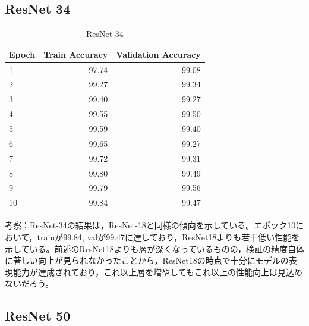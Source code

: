 \documentclass[a4paper,11pt,titlepage]{jsarticle}
\begin{document}
\subsection{ResNet 34}
\begin{table}[h]
\centering
\caption{ResNet-34}
\label{tab:ResNet34}
\begin{tabular}{lrr}
\hline
 Epoch &  Train Accuracy &  Validation Accuracy \\
\hline
     1 &           97.74 &                99.08 \\
     2 &           99.27 &                99.34 \\
     3 &           99.40 &                99.27 \\
     4 &           99.55 &                99.50 \\
     5 &           99.59 &                99.40 \\
     6 &           99.65 &                99.27 \\
     7 &           99.72 &                99.31 \\
     8 &           99.80 &                99.49 \\
     9 &           99.79 &                99.56 \\
    10 &           99.84 &                99.47 \\
\hline
\end{tabular}
\end{table}

考察：ResNet-34の結果は，ResNet-18と同様の傾向を示している。エポック10において，trainが99.84, valが99.47に達しており，ResNet18よりも若干低い性能を示している。前述のResNet18よりも層が深くなっているものの，検証の精度自体に著しい向上が見られなかったことから，ResNet18の時点で十分にモデルの表現能力が達成されており，これ以上層を増やしてもこれ以上の性能向上は見込めないだろう。

\subsection{ResNet 50}
\end{document}

